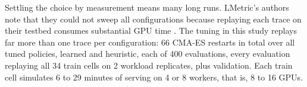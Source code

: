Settling the choice by measurement means many long runs. LMetric's authors note that they could
not sweep all configurations because replaying each trace on their testbed consumes substantial GPU
time \citep{zhang2026lmetric}. The tuning in this study replays far more than one trace per
configuration: 66 CMA-ES restarts in total over all tuned policies, learned and heuristic, each of
400 evaluations, every evaluation replaying all 34 train cells on 2 workload replicates, plus
validation. Each train cell simulates 6 to 29 minutes
of serving on 4 or 8 workers, that is, 8 to 16 GPUs.


